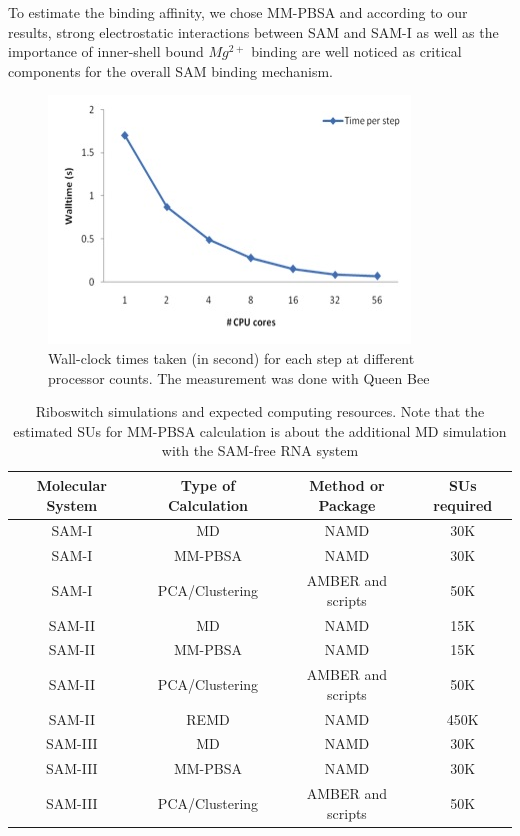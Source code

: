\documentclass[a4paper,10pt]{article}
\begin{document}
To estimate the binding affinity, we chose MM-PBSA and according to our results, strong electrostatic interactions between SAM and SAM-I as well as the importance of inner-shell bound $Mg^{2+}$ binding are well noticed as critical components for the overall SAM binding mechanism.  

\begin{figure}
\begin{center}
  \includegraphics[scale=0.660]{56k_scaling-2} \caption{Wall-clock times taken (in second) for each step at different processor counts. The measurement was done with Queen Bee }
\end{center}
\end{figure}

\begin{table}[h]
\begin{center}
  \caption{Riboswitch simulations and expected computing resources. Note that the estimated SUs for MM-PBSA calculation is about the additional MD simulation with the SAM-free RNA system  }
\label{table:systems}
\begin{tabular}{| c | c | c | c |}
\hline
Molecular System & Type of Calculation &   Method or Package  &   SUs required \\
\hline
SAM-I & MD &  NAMD &  30K\\
SAM-I & MM-PBSA & NAMD & 30K \\
SAM-I & PCA/Clustering &  AMBER and scripts &  50K\\
SAM-II &MD &  NAMD &  15K\\
SAM-II & MM-PBSA & NAMD & 15K \\
SAM-II & PCA/Clustering & AMBER and scripts & 50K \\
SAM-II & REMD &  NAMD &  450K\\
SAM-III &MD &  NAMD &  30K\\
SAM-III & MM-PBSA & NAMD & 30K \\
SAM-III & PCA/Clustering & AMBER and scripts & 50K \\
\hline
\end{tabular}
\end{center}
\end{table}
\end{document}
